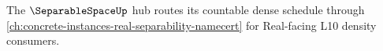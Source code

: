 The $\SeparableSpaceUp$ hub routes its countable dense schedule through \autoref{ch:concrete-instances-real-separability-namecert} for Real-facing L10 density consumers.



